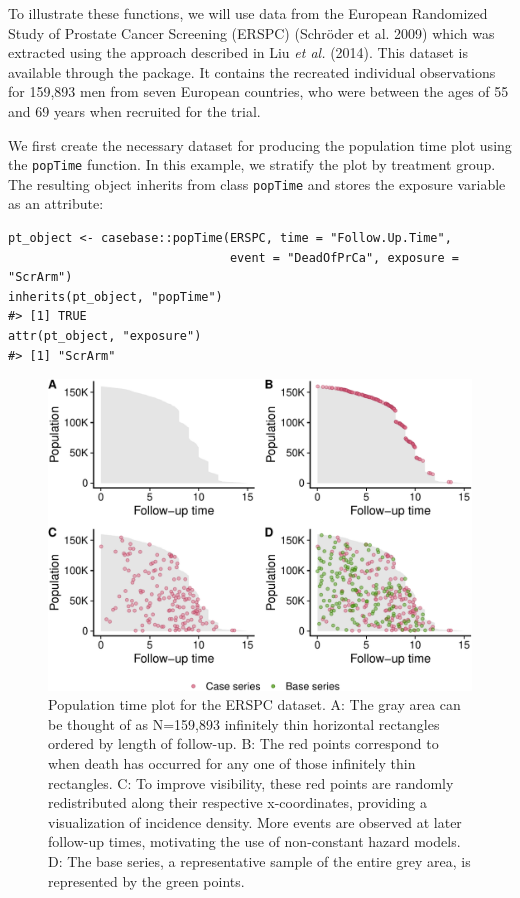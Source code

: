 To illustrate these functions, we will use data from the European Randomized Study of Prostate Cancer Screening (ERSPC) (Schröder et al. 2009) which was extracted using the approach described in Liu \emph{et al.} (2014). This dataset is available through the  package. It contains the recreated individual observations for 159,893 men from seven European countries, who were between the ages of 55 and 69 years when recruited for the trial.

We first create the necessary dataset for producing the population time plot using the \texttt{popTime} function. In this example, we stratify the plot by treatment group. The resulting object inherits from class \texttt{popTime} and stores the exposure variable as an attribute:

\begin{verbatim}
pt_object <- casebase::popTime(ERSPC, time = "Follow.Up.Time",
                               event = "DeadOfPrCa", exposure = "ScrArm")
inherits(pt_object, "popTime")
#> [1] TRUE
attr(pt_object, "exposure")
#> [1] "ScrArm"
\end{verbatim}

\begin{figure}[ht]
\includegraphics[width=\textwidth,keepaspectratio=true]{./plot-erspc-data-1} \caption{Population time plot for the ERSPC dataset. A: The gray area can be thought of as N=159,893 infinitely thin horizontal rectangles ordered by length of follow-up. B: The red points correspond to when death has occurred for any one of those infinitely thin rectangles. C: To improve visibility, these red points are randomly redistributed along their respective x-coordinates, providing a visualization of incidence density. More events are observed at later follow-up times, motivating the use of non-constant hazard models. D: The base series, a representative sample of the entire grey area, is represented by the green points.}\label{fig:plot-erspc-data}
\end{figure}

